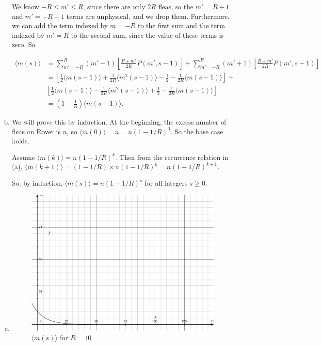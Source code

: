 \documentclass{article}
\begin{document}
\begin{enumerate}
\begin{enumerate}[(a)]
	We know $-R \leq m' \leq R$, since there are only $2R$ fleas, so the $m' = R+1$ and $m' = -R-1$ terms are unphysical, and we drop them. Furthermore, we can add the term indexed by $m=-R$ to the first sum and the term indexed by $m'=R$ to the second sum, since the value of these terms is zero. So

	\begin{align*}
	\langle m(s) \rangle &= \sum \limits_{m'=-R}^{R} (m'-1) \left[ \frac{R+m'}{2R} P(m',s-1) \right] + \sum \limits_{m'=-R}^{R} (m'+1) \left[ \frac{R-m'}{2R} P(m', s-1) \right] \\
	&= \left[ \frac{1}{2}\langle m(s-1) \rangle + \frac{1}{2R} \langle m^2(s-1) \rangle - \frac{1}{2} - \frac{1}{2R} \langle m(s-1) \rangle \right] + \\
	& \left[\frac{1}{2}\langle m(s-1) \rangle - \frac{1}{2R} \langle m^2(s-1) \rangle + \frac{1}{2} - \frac{1}{2R} \langle m(s-1) \rangle \right] \\
	&= \left(1 - \frac{1}{R} \right) \langle m(s-1) \rangle.
	\end{align*}

	\item 

	We will prove this by induction. At the beginning, the excess number of fleas on Rover is $n$, so $ 
	\langle m(0) \rangle = n = n(1 - 1/R)^0$. So the base case holds.

	Assume $\langle m(k) \rangle = n(1 - 1/R)^k$. Then from the recurrence relation in (a), $\langle m(k+1) \rangle = (1-1/R) \times n(1 - 1/R)^k = n(1 - 1/R)^{k+1}$.

	So, by induction, $\langle m(s) \rangle = n(1 - 1/R)^s$ for all integers $s \geq 0$.

	\item 

	\begin{figure}[H]
	\caption{$\langle m(s) \rangle$ for $R=10$}
	\centering
	\includegraphics[width=10cm]{img/plot1}
	\end{figure}


\end{enumerate}
\end{enumerate}
\end{document}
